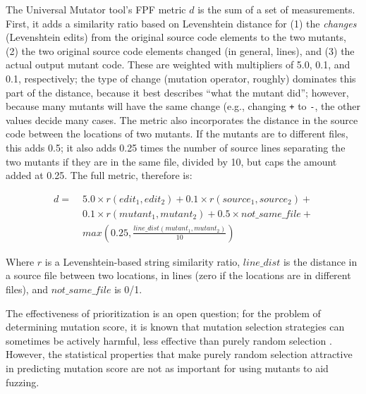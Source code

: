The Universal Mutator \cite{regexpMut} tool's FPF metric $d$ is
the sum of a set of measurements.  First, it adds a similarity
ratio based on Levenshtein distance \cite{lev} for (1) the \emph{changes} (Levenshtein edits) from
the original source code elements to
the two mutants,  (2) the two original source code elements changed (in
general, lines), and (3) the actual output mutant code.  These are
weighted with multipliers of 5.0, 0.1, and 0.1, respectively; the type
of change (mutation operator, roughly) dominates this part of the
distance, because it best describes ``what the mutant did''; however,
because many mutants will have the same change (e.g., changing {\tt +}
to {\tt -}, the other values decide many cases.
The metric also incorporates the distance in the source
code between the locations of two mutants.  If the mutants are to
different files, this adds 0.5; it also adds 0.25
times the number of source lines separating the two mutants if they
are in the same file, divided by 10, but caps the amount added at
0.25.  The full metric, therefore is:

\begin{align*}
d = \;&  5.0 \times r(\mathit{edit}_1, \mathit{edit}_2) + 0.1 \times
r(\mathit{source}_1, \mathit{source}_2) + \\
    & 0.1 \times r(\mathit{mutant}_1, \mathit{mutant}_2) + 0.5 \times
    \mathit{not\_same\_file} + \\
    & max(0.25, \frac{\mathit{line\_dist}(\mathit{mutant}_1, \mathit{mutant}_2)}{10})
\end{align*}

\noindent Where $r$ is a Levenshtein-based string similarity ratio,
$\mathit{line\_dist}$ is the distance in a source file between
two locations, in lines (zero if the locations are in different
files), and $\mathit{not\_same\_file}$ is 0/1.

The effectiveness of prioritization is an open question; for the problem of determining mutation score, it is known that mutation selection strategies can sometimes be actively harmful, less effective than purely random selection \cite{MutReduct}.  However, the statistical properties that make purely random selection attractive in predicting mutation score are not as important for using mutants to aid fuzzing.

